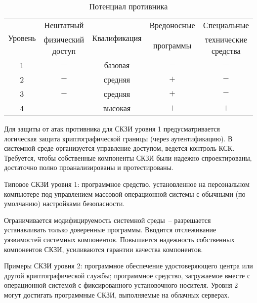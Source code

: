 
\begin{table}[hbt]
\caption{Потенциал противника}\label{Table.COMMON.Levels}
\begin{tabular}{|c|c|c|c|c|}
\hline
\multirow{2}{*}{Уровень} 
& Нештатный & \multirow{2}{*}{Квалификация} & Вредоносные & Специальные\\
& физический доступ & & программы & технические средства\\
\hline
\hline
1 & $-$ & базовая & $-$ & $-$\\
2 & $-$ & средняя & $+$ & $-$\\
3 & $+$ & средняя & $+$ & $-$\\
4 & $+$ & высокая & $+$ & $+$\\
\hline
\end{tabular}
\end{table}

Для защиты от атак противника для СКЗИ уровня 1 предусматривается логическая 
защита криптографической границы (через аутентификацию).
%
В системной среде организуется управление доступом, ведется контроль КСК.
% 
%
Требуется, чтобы собственные компоненты СКЗИ были надежно спроектированы,
достаточно полно проанализированы и протестированы.

Типовое СКЗИ уровня 1: программное средство, установленное на персональном
компьютере под управлением массовой операционной системы с обычными
(по умолчанию) настройками безопасности.

%
Ограничивается модифицируемость системной среды~-- разрешается устанавливать 
только доверенные программы.
%
%
Вводится отслеживание уязвимостей системных компонентов.
%
Повышается надежность собственных компонентов СКЗИ, 
%
%
усиливаются гарантии качества компонентов.
%

Примеры СКЗИ уровня 2: 
программное обеспечение удостоверяющего центра или другой криптографической службы;
%
программное средство, загружаемое вместе с операционной системой с 
фиксированного установочного носителя.
% 
%
Уровня 2 могут достигать программные СКЗИ, выполняемые на облачных серверах.

